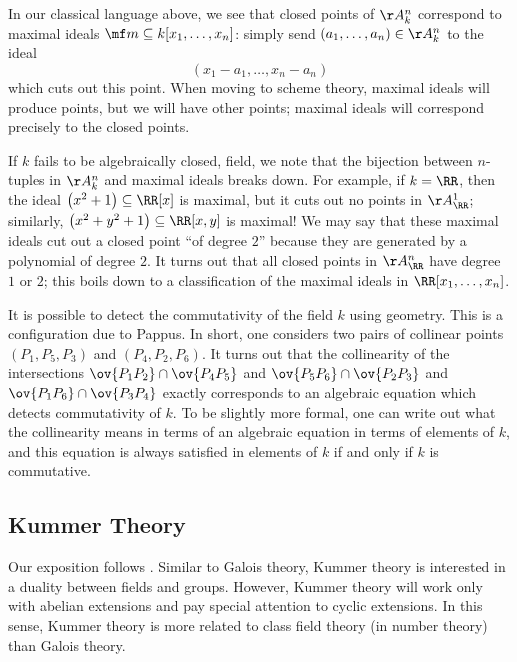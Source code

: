 \documentclass[../notes.tex]{subfiles}
\begin{document}
In our classical language above, we see that closed points of $\AA^n_k$ correspond to maximal ideals $\mf m\subseteq k[x_1,\ldots,x_n]$: simply send $(a_1,\ldots,a_n)\in\AA^n_k$ to the ideal
\[(x_1-a_1,\ldots,x_n-a_n)\]
which cuts out this point. When moving to scheme theory, maximal ideals will produce points, but we will have other points; maximal ideals will correspond precisely to the closed points.
\begin{remark}
	If $k$ fails to be algebraically closed, field, we note that the bijection between $n$-tuples in $\AA^n_k$ and maximal ideals breaks down. For example, if $k=\RR$, then the ideal $\left(x^2+1\right)\subseteq\RR[x]$ is maximal, but it cuts out no points in $\AA^1_\RR$; similarly, $\left(x^2+y^2+1\right)\subseteq\RR[x,y]$ is maximal! We may say that these maximal ideals cut out a closed point ``of degree $2$'' because they are generated by a polynomial of degree $2$. It turns out that all closed points in $\AA^n_\RR$ have degree $1$ or $2$; this boils down to a classification of the maximal ideals in $\RR[x_1,\ldots,x_n]$.
\end{remark}
\begin{remark}[Pappus]
	It is possible to detect the commutativity of the field $k$ using geometry. This is a configuration due to Pappus. In short, one considers two pairs of collinear points $(P_1,P_5,P_3)$ and $(P_4,P_2,P_6)$. It turns out that the collinearity of the intersections $\ov{P_1P_2}\cap \ov{P_4P_5}$ and $\ov{P_5P_6}\cap \ov{P_2P_3}$ and $\ov{P_1P_6}\cap \ov{P_3P_4}$ exactly corresponds to an algebraic equation which detects commutativity of $k$. To be slightly more formal, one can write out what the collinearity means in terms of an algebraic equation in terms of elements of $k$, and this equation is always satisfied in elements of $k$ if and only if $k$ is commutative.
\end{remark}

\subsection{Kummer Theory}
Our exposition follows \cite[Theorems~IV.8.1--IV.8.2]{lang-algebra}. Similar to Galois theory, Kummer theory is interested in a duality between fields and groups. However, Kummer theory will work only with abelian extensions and pay special attention to cyclic extensions. In this sense, Kummer theory is more related to class field theory (in number theory) than Galois theory.
\end{document}
